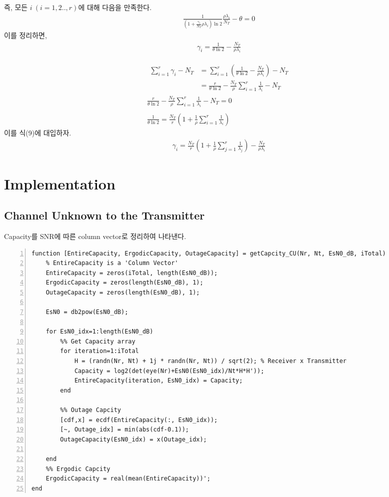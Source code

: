 \documentclass{article}
\begin{document}
즉, 모든 $i\ (i=1,2..,r)$에 대해 다음을 만족한다.
\begin{gather}
\frac{1}{(1+\frac{\gamma_i}{N_T}\rho\lambda_i)\ln2}\frac{\rho\lambda_i}{N_T}-\theta=0
\end{gather}
이를 정리하면,
\begin{gather}
\gamma_i=\frac{1}{\theta\ln2}-\frac{N_T}{\rho\lambda_i}
\end{gather}

\begin{gather}
\begin{split}
\sum_{i=1}^r\gamma_i-N_T &= \sum_{i=1}^r(\frac{1}{\theta\ln2}-\frac{N_T}{\rho\lambda_i})-N_T\\
&=\frac{r}{\theta\ln2}-\frac{N_T}{\rho}\sum_{i=1}^r\frac{1}{\lambda_i}-N_T
\end{split}\\
\frac{r}{\theta\ln2}-\frac{N_T}{\rho}\sum_{i=1}^r\frac{1}{\lambda_i}-N_T=0\\
\\
\frac{1}{\theta\ln2}=\frac{N_T}{r}(1+\frac{1}{\rho}\sum_{i=1}^r\frac{1}{\lambda_i})
\end{gather}
이를 식(9)에 대입하자.
\begin{gather}
\gamma_i = \frac{N_T}{r}(1+\frac{1}{\rho}\sum_{j=1}^r\frac{1}{\lambda_j}) - \frac{N_T}{\rho\lambda_i}
\end{gather}
\newpage
\section{Implementation}
\subsection{Channel Unknown to the Transmitter}
Capacity를 SNR에 따른 column vector로 정리하여 나타낸다.
\begin{adjustwidth}{-1.5cm}{-1.5cm}
\begin{lstlisting}[style=Matlab-editor, frame=single, numbers=left,]
function [EntireCapacity, ErgodicCapacity, OutageCapacity] = getCapcity_CU(Nr, Nt, EsN0_dB, iTotal)
    % EntireCapacity is a 'Column Vector'
    EntireCapacity = zeros(iTotal, length(EsN0_dB));
    ErgodicCapacity = zeros(length(EsN0_dB), 1);
    OutageCapacity = zeros(length(EsN0_dB), 1);
    
    EsN0 = db2pow(EsN0_dB);
    
    for EsN0_idx=1:length(EsN0_dB)
        %% Get Capacity array
        for iteration=1:iTotal
            H = (randn(Nr, Nt) + 1j * randn(Nr, Nt)) / sqrt(2); % Receiver x Transmitter
            Capacity = log2(det(eye(Nr)+EsN0(EsN0_idx)/Nt*H*H'));
            EntireCapacity(iteration, EsN0_idx) = Capacity;
        end
        
        %% Outage Capcity
        [cdf,x] = ecdf(EntireCapacity(:, EsN0_idx));
        [~, Outage_idx] = min(abs(cdf-0.1));
        OutageCapacity(EsN0_idx) = x(Outage_idx);
        
    end
    %% Ergodic Capcity
    ErgodicCapacity = real(mean(EntireCapacity))';
end
\end{lstlisting}
\end{adjustwidth}
\newpage
\end{document}
